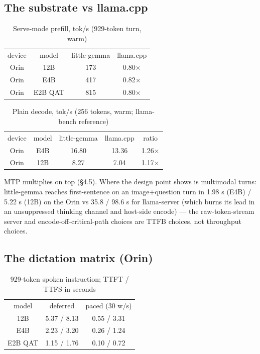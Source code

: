 \documentclass[journal]{IEEEtran}
\begin{document}
\subsection{The substrate vs llama.cpp}

\begin{table}[H]
    \begin{tabular}{cccc}
        device & model  & little-gemma  & llama.cpp \\
        Orin & 12B & 173 & 0.80×\\
        Orin & E4B & 417 & 0.82×\\
        Orin & E2B QAT & 815 & 0.80×\\
    \end{tabular}
    \caption{Serve-mode prefill, tok/s (929-token turn, warm)}
    \label{tab:serve-mode-prefill}
\end{table}


\begin{table}[H]
    \begin{tabular}{ccccc}
        device & model  & little-gemma  & llama.cpp & ratio\\
         Orin & E4B & 16.80 & 13.36 & 1.26×\\
         Orin & 12B & 8.27 & 7.04 & 1.17×\\
    \end{tabular}
    \caption{Plain decode, tok/s (256 tokens, warm; llama-bench reference)}
    \label{tab:plain-decode}
\end{table}

MTP multiplies on top (§4.5). Where the design point shows is multimodal turns: little-gemma reaches first-sentence on an image+question turn in 1.98 s (E4B) / 5.22 s (12B) on the Orin vs 35.8 / 98.6 s for llama-server (which burns its lead in an unsuppressed thinking channel and host-side encode) — the raw-token-stream server and encode-off-critical-path choices are TTFB choices, not throughput choices.

\subsection{The dictation matrix (Orin)}


\begin{table}[H]
    \begin{tabular}{ccc}
        model & deferred & paced (30 w/s) \\
        12B & 5.37 / 8.13 & 0.55 / 3.31 \\
        E4B & 2.23 / 3.20 & 0.26 / 1.24 \\
        E2B QAT & 1.15 / 1.76 & 0.10 / 0.72\\
    \end{tabular}
    \caption{929-token spoken instruction; TTFT / TTFS in seconds}
    \label{tab:929-token}
\end{table}
\end{document}
